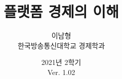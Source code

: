 \documentclass[11pt, a4paper]{lecturenote}
\begin{document}
\title{플랫폼 경제의 이해}
\author{이남형 \medskip\\{\normalsize 한국방송통신대학교 경제학과}}
\date{2021년 2학기 \medskip\\{\normalsize Ver. 1.02}}
\maketitle




\tableofcontents
\listoffigures
\listoftables
%






%













%



\end{document}

